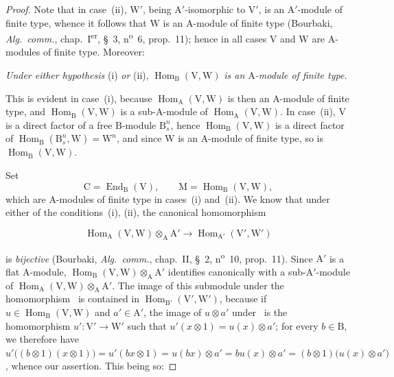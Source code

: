 \begin{proof}
Note that in case~(ii), $\mathrm{W}'$, being $\mathrm{A}'$-isomorphic to $\mathrm{V}'$, is an
$\mathrm{A}'$-module of finite type, whence it follows that $\mathrm{W}$ is an
$\mathrm{A}$-module of finite type (Bourbaki, \emph{Alg.\ comm.},
chap.~I\textsuperscript{er}, \S~3, n\textsuperscript{o}~6, prop.~11); hence in all cases
$\mathrm{V}$ and $\mathrm{W}$ are $\mathrm{A}$-modules of finite type. Moreover:

\begin{env}[2.5.8.1]
\label{IV.2.5.8.1}
\emph{Under either hypothesis} (i) \emph{or} (ii),
$\operatorname{Hom}_{\mathrm{B}}(\mathrm{V},\mathrm{W})$
\emph{is an $\mathrm{A}$-module of finite type.}
\end{env}

This is evident in case~(i), because
$\operatorname{Hom}_{\mathrm{A}}(\mathrm{V},\mathrm{W})$ is then an
$\mathrm{A}$-module of finite type, and
$\operatorname{Hom}_{\mathrm{B}}(\mathrm{V},\mathrm{W})$ is a
sub-$\mathrm{A}$-module of $\operatorname{Hom}_{\mathrm{A}}(\mathrm{V},\mathrm{W})$.
In case~(ii), $\mathrm{V}$ is a direct factor
of a free $\mathrm{B}$-module $\mathrm{B}_s^n$, hence
$\operatorname{Hom}_{\mathrm{B}}(\mathrm{V},\mathrm{W})$ is a direct
factor of $\operatorname{Hom}_{\mathrm{B}}(\mathrm{B}_s^n,\mathrm{W})
=\mathrm{W}^n$, and since $\mathrm{W}$ is an $\mathrm{A}$-module of finite
type, so is $\operatorname{Hom}_{\mathrm{B}}(\mathrm{V},\mathrm{W})$.

Set
\[
  \mathrm{C}=\operatorname{End}_{\mathrm{B}}(\mathrm{V}),\qquad \mathrm{M}=\operatorname{Hom}_{\mathrm{B}}(\mathrm{V},\mathrm{W}),
\]
which are $\mathrm{A}$-modules of finite type in cases~(i) and~(ii). We
know that under either of the conditions~(i), (ii), the canonical homomorphism

\begin{env}[2.5.8.2]
\label{IV.2.5.8.2}
\[
  \operatorname{Hom}_{\mathrm{A}}(\mathrm{V},\mathrm{W})\otimes_{\mathrm{A}}\mathrm{A}' \to \operatorname{Hom}_{\mathrm{A}'}(\mathrm{V}',\mathrm{W}')
\]
\end{env}

is \emph{bijective} (Bourbaki, \emph{Alg.\ comm.}, chap.~II, \S~2, n\textsuperscript{o}~10,
prop.~11). Since $\mathrm{A}'$ is a flat $\mathrm{A}$-module, $\operatorname{Hom}_{\mathrm{B}}(\mathrm{V},\mathrm{W})
\otimes_{\mathrm{A}}\mathrm{A}'$
identifies canonically with a sub-$\mathrm{A}'$-module of
$\operatorname{Hom}_{\mathrm{A}}(\mathrm{V},\mathrm{W})
\otimes_{\mathrm{A}}\mathrm{A}'$. The image of this submodule under the
homomorphism~
is contained in $\operatorname{Hom}_{\mathrm{B}'}(\mathrm{V}',\mathrm{W}')$,
because if $u\in\operatorname{Hom}_{\mathrm{B}}(\mathrm{V},\mathrm{W})$ and
$a'\in\mathrm{A}'$, the image of $u\otimes a'$ under~ is the homomorphism
$u':\mathrm{V}'\to\mathrm{W}'$ such that
$u'(x\otimes1)=u(x)\otimes a'$; for every $b\in\mathrm{B}$, we therefore have
$u'\bigl((b\otimes1)(x\otimes1)\bigr)
=u'(bx\otimes1)
=u(bx)\otimes a'
=bu(x)\otimes a'
=(b\otimes1)\bigl(u(x)\otimes a'\bigr)$, whence our assertion. This being so:


\end{proof}

